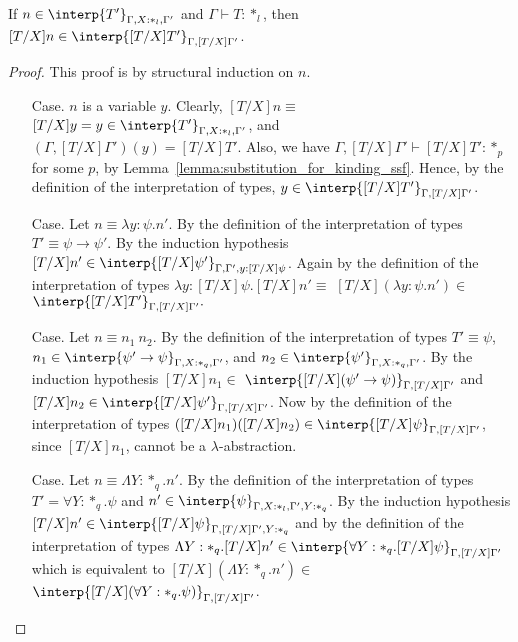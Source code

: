 \begin{lemma}
  If $n \in \interp{T'}_{\Gamma,X:*_l,\Gamma'}$ and 
  $\Gamma \vdash T:*_l$, then 
  $[T/X]n \in \interp{[T/X]T'}_{\Gamma,[T/X]\Gamma'}$.
  \label{lemma:type_sub_ssf}
\end{lemma}
\begin{proof}
  This proof is by structural induction on $n$.
\begin{itemize}
\item[Case.] $n$ is a variable $y$.  Clearly, $[T/X]n \equiv $
  $[T/X]y = y \in \interp{T'}_{\Gamma,X:*_l,\Gamma'}$, and\\
  $(\Gamma,[T/X]\Gamma')(y) = [T/X]T'$. Also,
  we have $\Gamma,[T/X]\Gamma' \vdash [T/X]T':*_p$ for some $p$, by 
  Lemma~\ref{lemma:substitution_for_kinding_ssf}. Hence,
  by the definition of the interpretation of types, 
  $y \in \interp{[T/X]T'}_{\Gamma,[T/X]\Gamma'}$.
  
\item[Case.] Let $n \equiv \lambda y:\psi.n'$.  By the definition of the
  interpretation of types $T' \equiv \psi \rightarrow \psi'$.  
  By the induction hypothesis 
  $[T/X]n' \in \interp{[T/X]\psi'}_{\Gamma,\Gamma',y:[T/X]\psi}$. 
  Again by the definition of the interpretation of types
  $\lambda y:[T/X]\psi.[T/X]n' \equiv $
  $[T/X](\lambda y:\psi.n') \in $
  $\interp{[T/X]T'}_{\Gamma,[T/X]\Gamma'}.$
  
\item[Case.]  Let $n \equiv n_1\ n_2$.  By the definition of the 
  interpretation of types $T' \equiv \psi$, 
  $n_1 \in \interp{\psi' \rightarrow \psi}_{\Gamma,X:*_q,\Gamma'}$, and
  $n_2 \in \interp{\psi'}_{\Gamma,X:*_q,\Gamma'}$.  By the induction hypothesis 
  $[T/X]n_1 \in $
  $\interp{[T/X](\psi' \rightarrow \psi)}_{\Gamma,[T/X]\Gamma'}$ and
  $[T/X]n_2 \in \interp{[T/X]\psi'}_{\Gamma,[T/X]\Gamma'}$.  Now by
  the definition of the interpretation of types 
  $([T/X]n_1)([T/X]n_2) \in \interp{[T/X]\psi}_{\Gamma,[T/X]\Gamma'}$,
  since $[T/X]n_1$, cannot be a $\lambda$-abstraction.
  
\item[Case.]  Let $n \equiv \Lambda Y:*_q.n'$.  By the definition of the
  interpretation of types $T' = \forall Y:*_q.\psi$ and 
  $n' \in \interp{\psi}_{\Gamma,X:*_l,\Gamma',Y:*_q}$.  By the induction 
  hypothesis \\
  $[T/X]n' \in \interp{[T/X]\psi}_{\Gamma,[T/X]\Gamma',Y:*_q}$ and by
  the definition of the interpretation of types 
  $\Lambda Y:*_q.[T/X]n' \in 
  \interp{\forall Y:*_q.[T/X]\psi}_{\Gamma,[T/X]\Gamma'}$ which is 
  equivalent to
  $[T/X](\Lambda Y:*_q.n') \in $
  $\interp{[T/X](\forall Y:*_q.\psi)}_{\Gamma,[T/X]\Gamma'}$.
  

\end{itemize}
\end{proof}
